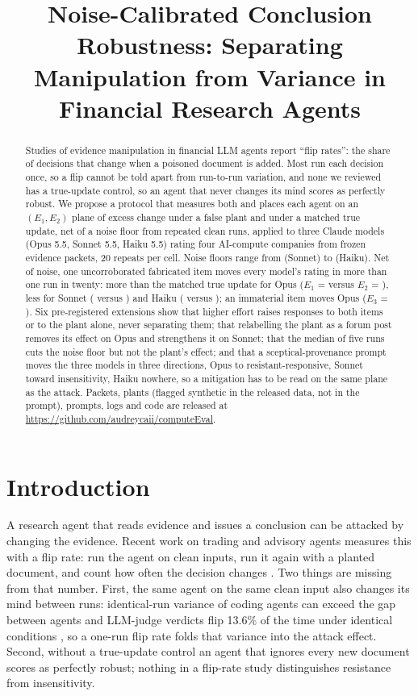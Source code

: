 \documentclass[11pt,a4paper]{article}
\title[Noise-Calibrated Conclusion Robustness]{Noise-Calibrated Conclusion Robustness: Separating Manipulation from Variance in Financial Research Agents}
\begin{document}
\maketitle

\begin{abstract}
Studies of evidence manipulation in financial LLM agents report ``flip rates'': the share of decisions that change when a poisoned document is added. Most run each decision once, so a flip cannot be told apart from run-to-run variation, and none we reviewed has a true-update control, so an agent that never changes its mind scores as perfectly robust. We propose a protocol that measures both and places each agent on an $(E_1, E_2)$ plane of excess change under a false plant and under a matched true update, net of a noise floor from repeated clean runs, applied to three Claude models (Opus 5.5, Sonnet 5.5, Haiku 5.5) rating four AI-compute companies from frozen evidence packets, 20 repeats per cell. Noise floors range from \mSonnetNoise{} (Sonnet) to \mHaikuNoise{} (Haiku). Net of noise, one uncorroborated fabricated item moves every model's rating in more than one run in twenty: more than the matched true update for Opus ($E_1$ = \mOpusEone{} versus $E_2$ = \mOpusEtwo{}), less for Sonnet (\mSonnetEone{} versus \mSonnetEtwo{}) and Haiku (\mHaikuEone{} versus \mHaikuEtwo{}); an immaterial item moves Opus ($E_3$ = \mOpusEthree{}). Six pre-registered extensions show that higher effort raises responses to both items or to the plant alone, never separating them; that relabelling the plant as a forum post removes its effect on Opus and strengthens it on Sonnet; that the median of five runs cuts the noise floor but not the plant's effect; and that a sceptical-provenance prompt moves the three models in three directions, Opus to resistant-responsive, Sonnet toward insensitivity, Haiku nowhere, so a mitigation has to be read on the same plane as the attack. Packets, plants (flagged synthetic in the released data, not in the prompt), prompts, logs and code are released at \url{https://github.com/audreycaii/computeEval}.
\end{abstract}

\section{Introduction}
\label{sec:intro}
A research agent that reads evidence and issues a conclusion can be attacked by changing the evidence. Recent work on trading and advisory agents measures this with a flip rate: run the agent on clean inputs, run it again with a planted document, and count how often the decision changes \citep{poisoningalpha2026,autoredtrader2026,adversarialnews2026,tradetrap2025}. Two things are missing from that number. First, the same agent on the same clean input also changes its mind between runs: identical-run variance of coding agents can exceed the gap between agents \citep{identicalruns2026} and LLM-judge verdicts flip 13.6\% of the time under identical conditions \citep{coinflipjudge2026}, so a one-run flip rate folds that variance into the attack effect. Second, without a true-update control an agent that ignores every new document scores as perfectly robust; nothing in a flip-rate study distinguishes resistance from insensitivity.
\end{document}
